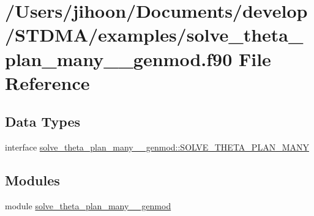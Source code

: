\hypertarget{solve__theta__plan__many____genmod_8f90}{}\section{/\+Users/jihoon/\+Documents/develop/\+S\+T\+D\+M\+A/examples/solve\+\_\+theta\+\_\+plan\+\_\+many\+\_\+\+\_\+genmod.f90 File Reference}
\label{solve__theta__plan__many____genmod_8f90}
\subsection*{Data Types}
\begin{DoxyCompactItemize}
\item 
interface \mbox{\hyperlink{interfacesolve__theta__plan__many____genmod_1_1_s_o_l_v_e___t_h_e_t_a___p_l_a_n___m_a_n_y}{solve\+\_\+theta\+\_\+plan\+\_\+many\+\_\+\+\_\+genmod\+::\+S\+O\+L\+V\+E\+\_\+\+T\+H\+E\+T\+A\+\_\+\+P\+L\+A\+N\+\_\+\+M\+A\+NY}}
\end{DoxyCompactItemize}
\subsection*{Modules}
\begin{DoxyCompactItemize}
\item 
module \mbox{\hyperlink{namespacesolve__theta__plan__many____genmod}{solve\+\_\+theta\+\_\+plan\+\_\+many\+\_\+\+\_\+genmod}}
\end{DoxyCompactItemize}
